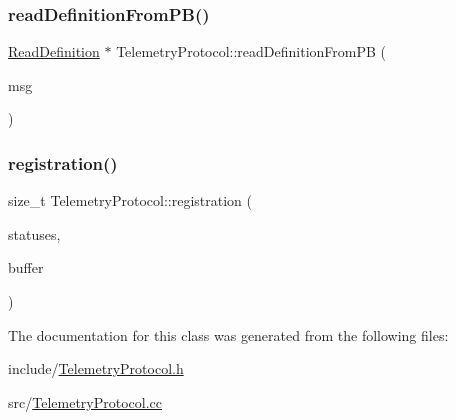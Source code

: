 \mbox{\label{class_telemetry_protocol_a90e74801cf6d35be65276720839165ab}} 
\subsubsection{\texorpdfstring{read\+Definition\+From\+P\+B()}{readDefinitionFromPB()}}
{\footnotesize\ttfamily \mbox{\hyperlink{struct_read_definition}{Read\+Definition}} $\ast$ Telemetry\+Protocol\+::read\+Definition\+From\+PB (\begin{DoxyParamCaption}\item[{Provisioning\+\_\+\+Read\+Def \&}]{msg }\end{DoxyParamCaption})\hspace{0.3cm}{\ttfamily [static]}}

\mbox{\label{class_telemetry_protocol_ad8584639767a19015907168116f21c4b}} 
\subsubsection{\texorpdfstring{registration()}{registration()}}
{\footnotesize\ttfamily size\+\_\+t Telemetry\+Protocol\+::registration (\begin{DoxyParamCaption}\item[{std\+::vector$<$ \mbox{\hyperlink{struct_peripheral_status}{Peripheral\+Status}} $>$ $\ast$}]{statuses,  }\item[{uint8\+\_\+t $\ast$}]{buffer }\end{DoxyParamCaption})\hspace{0.3cm}{\ttfamily [static]}}



The documentation for this class was generated from the following files\+:\begin{DoxyCompactItemize}
\item 
include/\mbox{\hyperlink{_telemetry_protocol_8h}{Telemetry\+Protocol.\+h}}\item 
src/\mbox{\hyperlink{_telemetry_protocol_8cc}{Telemetry\+Protocol.\+cc}}\end{DoxyCompactItemize}
